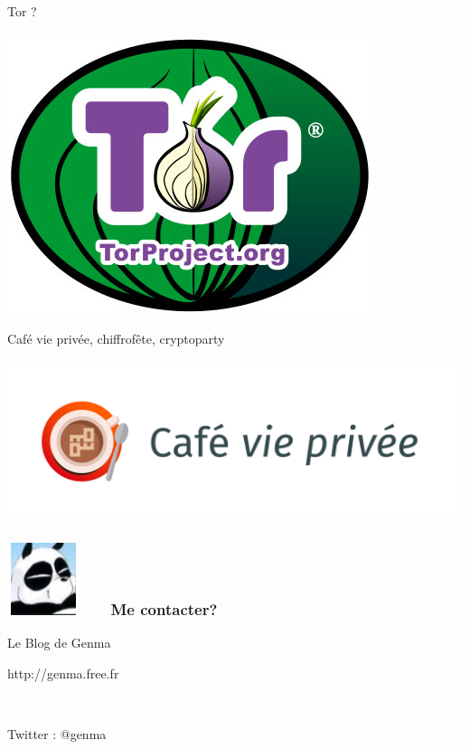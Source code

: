 \documentclass{beamer}
\begin{document}
\begin{frame}
\begin{center}
\Huge{Tor ? }
\\~\\ \includegraphics[scale=0.4]{./images/logo_tor.jpg}
\end{center}
\end{frame}

\begin{frame}
\begin{center}
\Huge{Café vie privée, chiffrofête, cryptoparty}
\\~\\
\includegraphics[scale=0.3] {./images/LogoCafeViePrivee.jpg}
\end{center}
\end{frame}

\begin{frame}
\frametitle{\includegraphics[scale=0.4]{./images/Genma.jpg} \ \ \  Me contacter?}
\Huge{\centerline{Le Blog de Genma}}
\Huge{\centerline{http://genma.free.fr}}
\Huge{\centerline{~}}
\Huge{\centerline{Twitter : @genma}}
\end{frame}
\end{document}
